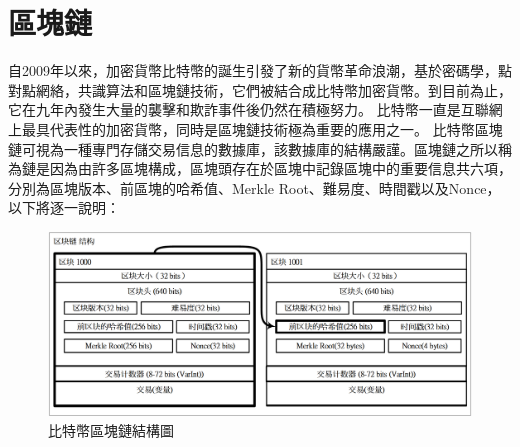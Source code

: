 		\section{區塊鏈}
		自2009年以來，加密貨幣比特幣的誕生引發了新的貨幣革命浪潮，基於密碼學，點對點網絡，共識算法和區塊鏈技術，它們被結合成比特幣加密貨幣。到目前為止，它在九年內發生大量的襲擊和欺詐事件後仍然在積極努力。 比特幣一直是互聯網上最具代表性的加密貨幣，同時是區塊鏈技術極為重要的應用之一。
		比特幣區塊鏈可視為一種專門存儲交易信息的數據庫，該數據庫的結構嚴謹。區塊鏈之所以稱為鏈是因為由許多區塊構成，區塊頭存在於區塊中記錄區塊中的重要信息共六項，分別為區塊版本、前區塊的哈希值、Merkle Root、難易度、時間戳以及Nonce，以下將逐一說明：

			\begin{figure}[!htbp]
				\centering
				\includegraphics[width = 1\textwidth]{blockchain.png}
				\caption{比特幣區塊鏈結構圖}\label{blockchain}
			\end{figure}

